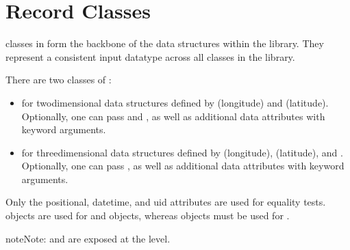 \documentclass[letterpaper,10pt,english]{sphinxmanual}
\begin{document}
\sphinxstepscope


\chapter{Record Classes}
\label{\detokenize{record:record-classes}}\label{\detokenize{record::doc}}
\sphinxAtStartPar
{} classes in  form the back\sphinxhyphen{}bone of the data structures within the library. They represent a
consistent input data\sphinxhyphen{}type across all classes in the library.

\sphinxAtStartPar
There are two classes of :
\begin{itemize}
\item {} 
\sphinxAtStartPar
{} for two\sphinxhyphen{}dimensional data structures defined by  (longitude) and 
(latitude). Optionally, one can pass  and , as well as additional data attributes with keyword
arguments.

\item {} 
\sphinxAtStartPar
{} for three\sphinxhyphen{}dimensional data structures defined by  (longitude),
 (latitude), and . Optionally, one can pass , as well as additional data attributes with
keyword arguments.

\end{itemize}

\sphinxAtStartPar
Only the positional, datetime, and uid attributes are used for equality tests.  objects are used for
 and  objects, whereas  objects must be used for .

\begin{sphinxadmonition}{note}{Note:}
\sphinxAtStartPar
{} and  are exposed at the  level.
\end{sphinxadmonition}
\end{document}

